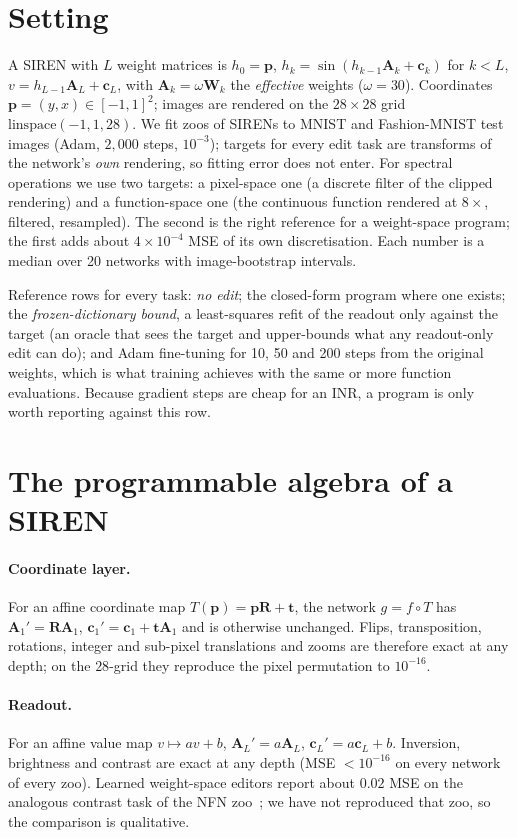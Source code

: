 \documentclass[11pt]{article}
\begin{document}
\section{Setting}
\label{sec:setting}
A SIREN with $L$ weight matrices is $h_0=\mathbf p$, $h_k=\sin(h_{k-1}\mathbf A_k+\mathbf c_k)$ for $k<L$, $v=h_{L-1}\mathbf A_L+\mathbf c_L$, with $\mathbf A_k=\omega\mathbf W_k$ the \emph{effective} weights ($\omega=30$). Coordinates $\mathbf p=(y,x)\in[-1,1]^2$; images are rendered on the $28\times28$ grid $\mathrm{linspace}(-1,1,28)$. We fit zoos of SIRENs to MNIST and Fashion-MNIST test images (Adam, $2{,}000$ steps, $10^{-3}$); targets for every edit task are transforms of the network's \emph{own} rendering, so fitting error does not enter. For spectral operations we use two targets: a pixel-space one (a discrete filter of the clipped rendering) and a function-space one (the continuous function rendered at $8\times$, filtered, resampled). The second is the right reference for a weight-space program; the first adds about $4\times10^{-4}$ MSE of its own discretisation. Each number is a median over 20 networks with image-bootstrap intervals.

Reference rows for every task: \emph{no edit}; the closed-form program where one exists; the \emph{frozen-dictionary bound}, a least-squares refit of the readout only against the target (an oracle that sees the target and upper-bounds what any readout-only edit can do); and Adam fine-tuning for 10, 50 and 200 steps from the original weights, which is what training achieves with the same or more function evaluations. Because gradient steps are cheap for an INR, a program is only worth reporting against this row.

\section{The programmable algebra of a SIREN}
\label{sec:algebra}
\paragraph{Coordinate layer.} For an affine coordinate map $T(\mathbf p)=\mathbf p\mathbf R+\mathbf t$, the network $g=f\circ T$ has $\mathbf A_1'=\mathbf R\mathbf A_1$, $\mathbf c_1'=\mathbf c_1+\mathbf t\mathbf A_1$ and is otherwise unchanged. Flips, transposition, rotations, integer and sub-pixel translations and zooms are therefore exact at any depth; on the $28$-grid they reproduce the pixel permutation to $10^{-16}$.
\paragraph{Readout.} For an affine value map $v\mapsto av+b$, $\mathbf A_L'=a\mathbf A_L$, $\mathbf c_L'=a\mathbf c_L+b$. Inversion, brightness and contrast are exact at any depth (MSE $<10^{-16}$ on every network of every zoo). Learned weight-space editors report about $0.02$ MSE on the analogous contrast task of the NFN zoo~\citep{zhou2023nfn,zhou2023nft}; we have not reproduced that zoo, so the comparison is qualitative.
\end{document}
